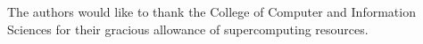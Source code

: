 \documentclass[useAMS, referee, usenatbib]{biom}
\begin{document}
The authors would like to thank the College of Computer and Information Sciences for their gracious allowance of supercomputing resources.

 


\label{lastpage}

\end{document}
